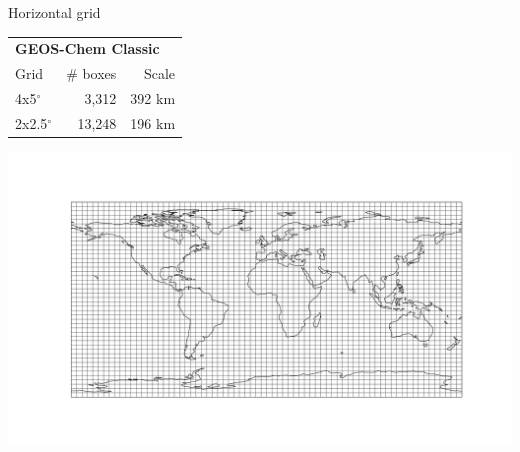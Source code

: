 \documentclass[10pt]{beamer}
\begin{document}
\begin{frame}[fragile]{Horizontal grid}
    \small
    \begin{minipage}[c]{0.5\textwidth}
        \begin{table}[]
        \begin{tabular}{lrr}
            \hline
            \multicolumn{3}{l}{\textbf{GEOS-Chem Classic}} \\ 
            Grid & \# boxes & Scale \\ 
            \hline
            4x5$^{\circ}$ & 3,312 & 392 km \\ 
            2x2.5$^{\circ}$ & 13,248 & 196 km \\ 
            \hline
        \end{tabular}
        \end{table}
    \end{minipage}
    \begin{minipage}[c]{0.49\textwidth}
        \includegraphics[height=0.4\textheight]{hgrid_4x5.png}
    \end{minipage}


\end{frame}
\end{document}
